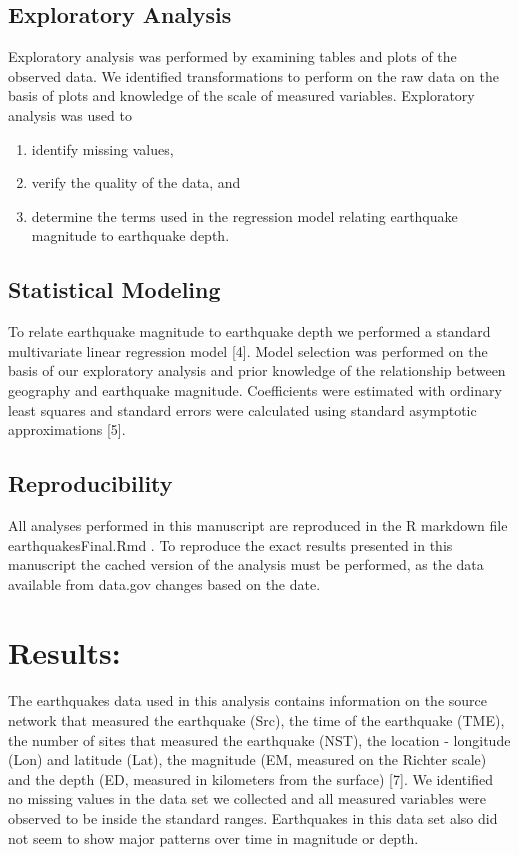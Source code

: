 \documentclass[a4paper,14pt]{extarticle}
\begin{document}
\subsection{Exploratory Analysis}

Exploratory analysis was performed by examining tables and plots of the observed data. We identified transformations to perform on the raw data on the basis of plots and knowledge of the scale of measured variables. Exploratory analysis was used to 

\begin{enumerate}
  \item identify missing values,
  \item verify the quality of the data, and 
  \item determine the terms used in the regression model relating earthquake magnitude to earthquake depth.
\end{enumerate}

\subsection{Statistical Modeling}

To relate earthquake magnitude to earthquake depth we performed a standard multivariate linear regression model [4]. Model selection was performed on the basis of our exploratory analysis and prior knowledge of the relationship between geography and earthquake magnitude. Coefficients were estimated with ordinary least squares and standard errors were calculated using standard asymptotic approximations [5].

\subsection{Reproducibility}

All analyses performed in this manuscript are reproduced in the R markdown file earthquakesFinal.Rmd \cite{r-markdown}. To reproduce the exact results presented in this manuscript the cached version of the analysis must be performed, as the data available from data.gov changes based on the date.


\section{Results:}

The earthquakes data used in this analysis contains information on the source network that measured the earthquake (Src), the time of the earthquake (TME), the number of sites that measured the earthquake (NST), the location - longitude (Lon) and latitude (Lat), the magnitude (EM, measured on the Richter scale) and the depth (ED, measured in kilometers from the surface) [7]. We identified no missing values in the data set we collected and all measured variables were observed to be inside the standard ranges. Earthquakes in this data set also did not seem to show major patterns over time in magnitude or depth.
\end{document}
